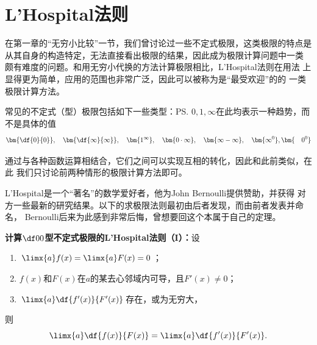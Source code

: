\section{L'Hospital法则}

在第一章的“无穷小比较”一节，我们曾讨论过一些不定式极限，这类极限的特点是
从其自身的构造特定，无法直接看出极限的结果，因此成为极限计算问题中一类
颇有难度的问题。和用无穷小代换的方法计算极限相比，L'Hospital法则在用法
上显得更为简单，应用的范围也非常广泛，因此可以被称为是“最受欢迎”的的
一类极限计算方法。

常见的不定式（型）极限包括如下一些类型：\ps{$0,1,\infty$在此均表示一种趋势，而不是具体的值}
$$\bm{\df{0}{0}}, \quad \bm{\df{\infty}{\infty}}, \quad
\bm{1^{\infty}}, \quad \bm{0\cdot\infty}, \quad
\bm{\infty-\infty}, \quad \bm{\infty^0}, \bm{\quad 0^0}$$
\begin{center}
\end{center}
通过与各种函数运算相结合，它们之间可以实现互相的转化，因此和此前类似，在此
我们只讨论前两种情形的极限计算方法即可。


L'Hospital是一个“著名”的数学爱好者，他为John Bernoulli提供赞助，并获得
对方一些最新的研究结果。以下的求极限法则最初由后者发现，而由前者发表并命名，
Bernoulli后来为此感到非常后悔，曾想要回这个本属于自己的定理。

\begin{thx}
	{\bf 计算$\df00$型不定式极限的L'Hospital法则（I）：}设
	\begin{enumerate}[(1)]
	  \item $\limx{a}f(x)=\limx{a}F(x)=0$；
	  \item $f(x)$和$F(x)$在$a$的某去心邻域内可导，且$F'(x)\ne0$；
	  \item $\limx{a}\df{f'(x)}{F'(x)}$存在，或为无穷大，
	\end{enumerate}
	则
	$$\limx{a}\df{f(x)}{F(x)}=\limx{a}\df{f'(x)}{F'(x)}.$$
\end{thx}

